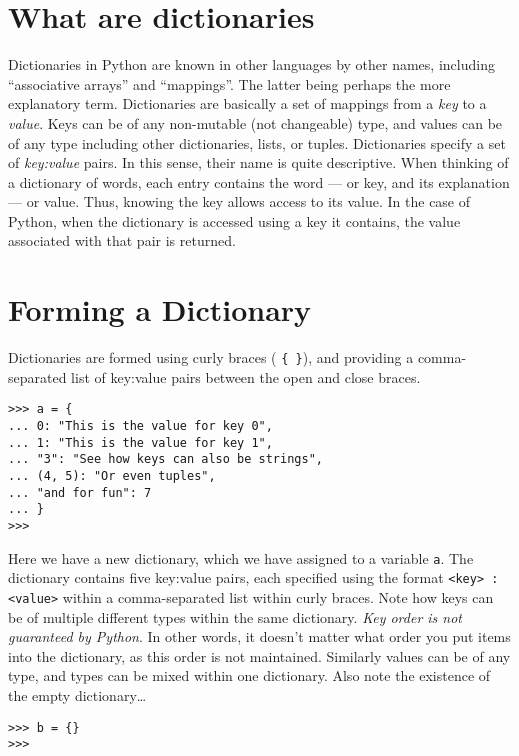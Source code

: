 \section{What are dictionaries}

Dictionaries in Python are known in other languages by other names,   including ``associative arrays'' and ``mappings''. The latter being perhaps   the more explanatory term. Dictionaries are basically a set of mappings   from a \textit{key} to a \textit{value}. Keys can be of   any non-mutable (not changeable) type, and values can be of any type including other   dictionaries, lists, or tuples. Dictionaries specify a set of \textit{key:value}   pairs. In this sense, their name is quite descriptive. When thinking of a dictionary of words, each entry contains the word --- or key, and its explanation --- or value.     Thus, knowing the key allows access to its value. In the case of Python, when the dictionary is accessed using a key it   contains, the value associated with that pair is returned.

\section{Forming a Dictionary}

Dictionaries are formed using curly braces (%
\texttt{\{ \}}), and   providing a comma-separated list of key:value pairs between the open   and close braces.
\lstset{keywordstyle=\ttfamily}
\begin{lstlisting}
>>> a = {
... 0: "This is the value for key 0",
... 1: "This is the value for key 1",
... "3": "See how keys can also be strings",
... (4, 5): "Or even tuples",
... "and for fun": 7
... }
>>>
\end{lstlisting}
\lstset{keywordstyle=\textbf}

Here we have a new dictionary, which we have assigned to a variable   \texttt{a}. The dictionary contains five key:value pairs, each specified using   the format 
\texttt{<key> : <value>} within a comma-separated list within curly braces. Note how keys can be of multiple   different types within the same dictionary. \textit{Key order is not   guaranteed by Python}. In other words, it doesn't matter what order you put items into the dictionary, as this order is not maintained.     Similarly values can be of any type, and   types can be mixed within one dictionary. Also note the existence of   the empty dictionary\ldots
\begin{lstlisting}
>>> b = {}
>>>
\end{lstlisting}

